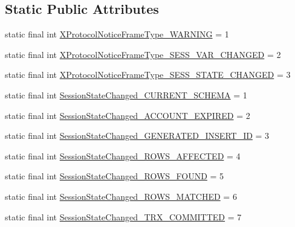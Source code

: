 \subsection*{Static Public Attributes}
\begin{DoxyCompactItemize}
\item 
static final int \mbox{\hyperlink{classcom_1_1mysql_1_1cj_1_1protocol_1_1x_1_1_notice_a9b6f1846f75fe7b30c9f3d976a3036fd}{X\+Protocol\+Notice\+Frame\+Type\+\_\+\+W\+A\+R\+N\+I\+NG}} = 1
\item 
static final int \mbox{\hyperlink{classcom_1_1mysql_1_1cj_1_1protocol_1_1x_1_1_notice_af74c4f7e379a384b60419a5da0dc6078}{X\+Protocol\+Notice\+Frame\+Type\+\_\+\+S\+E\+S\+S\+\_\+\+V\+A\+R\+\_\+\+C\+H\+A\+N\+G\+ED}} = 2
\item 
static final int \mbox{\hyperlink{classcom_1_1mysql_1_1cj_1_1protocol_1_1x_1_1_notice_abd827c545c711230257c652ac3375418}{X\+Protocol\+Notice\+Frame\+Type\+\_\+\+S\+E\+S\+S\+\_\+\+S\+T\+A\+T\+E\+\_\+\+C\+H\+A\+N\+G\+ED}} = 3
\item 
static final int \mbox{\hyperlink{classcom_1_1mysql_1_1cj_1_1protocol_1_1x_1_1_notice_aa59340b235c08a629497d9ce4b23f66e}{Session\+State\+Changed\+\_\+\+C\+U\+R\+R\+E\+N\+T\+\_\+\+S\+C\+H\+E\+MA}} = 1
\item 
static final int \mbox{\hyperlink{classcom_1_1mysql_1_1cj_1_1protocol_1_1x_1_1_notice_a04e6d78fdca76927f17e2d8ba6ee79e8}{Session\+State\+Changed\+\_\+\+A\+C\+C\+O\+U\+N\+T\+\_\+\+E\+X\+P\+I\+R\+ED}} = 2
\item 
static final int \mbox{\hyperlink{classcom_1_1mysql_1_1cj_1_1protocol_1_1x_1_1_notice_a40da7f7f7338b89708dcdf9fac31d110}{Session\+State\+Changed\+\_\+\+G\+E\+N\+E\+R\+A\+T\+E\+D\+\_\+\+I\+N\+S\+E\+R\+T\+\_\+\+ID}} = 3
\item 
static final int \mbox{\hyperlink{classcom_1_1mysql_1_1cj_1_1protocol_1_1x_1_1_notice_a09b465a9aece5ab24a03a519c4d41351}{Session\+State\+Changed\+\_\+\+R\+O\+W\+S\+\_\+\+A\+F\+F\+E\+C\+T\+ED}} = 4
\item 
static final int \mbox{\hyperlink{classcom_1_1mysql_1_1cj_1_1protocol_1_1x_1_1_notice_a5714d3753b1b8a63fb51615a5ab4b1cd}{Session\+State\+Changed\+\_\+\+R\+O\+W\+S\+\_\+\+F\+O\+U\+ND}} = 5
\item 
static final int \mbox{\hyperlink{classcom_1_1mysql_1_1cj_1_1protocol_1_1x_1_1_notice_a4a7381a136a4918be60c07e75dd4e3ef}{Session\+State\+Changed\+\_\+\+R\+O\+W\+S\+\_\+\+M\+A\+T\+C\+H\+ED}} = 6
\item 
static final int \mbox{\hyperlink{classcom_1_1mysql_1_1cj_1_1protocol_1_1x_1_1_notice_ac5e672d4dab6b2a0e0feb7e793b05846}{Session\+State\+Changed\+\_\+\+T\+R\+X\+\_\+\+C\+O\+M\+M\+I\+T\+T\+ED}} = 7

\end{DoxyCompactItemize}
